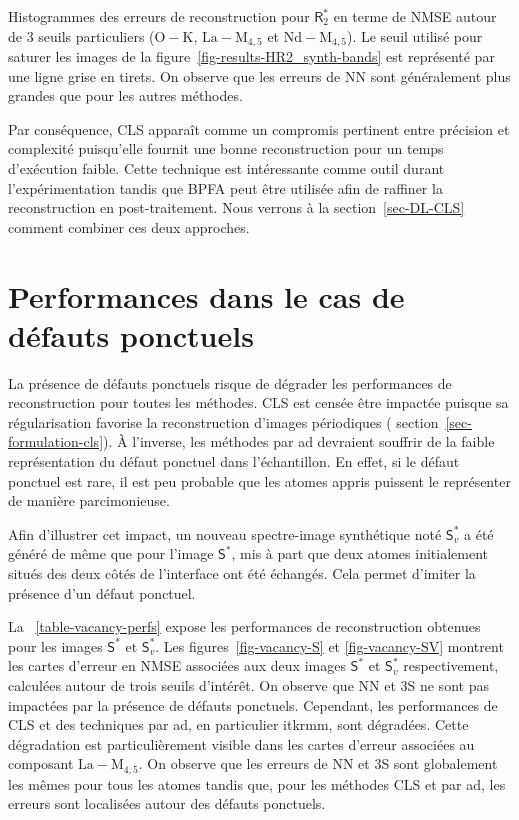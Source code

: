 \begin{normalfigure*}
    \caption{Histogrammes des erreurs de reconstruction pour $\mathsf{R}_2^*$ en terme de NMSE autour de 3 seuils particuliers ($\mathrm{O-K}$, $\mathrm{La-M}_{4, 5}$ et $\mathrm{Nd-M}_{4, 5}$). Le seuil utilisé pour saturer les images de la figure~\protect\ref{fig-results-HR2_synth-bands} est représenté par une ligne grise en tirets. On observe que les erreurs de NN sont généralement plus grandes que pour les autres méthodes.
        \protect\label{fig-qu1-21-histograms}}    
\end{normalfigure*}


Par conséquence, CLS apparaît comme un compromis pertinent entre précision et complexité puisqu'elle fournit une bonne reconstruction pour un temps d'exécution faible. Cette technique est intéressante comme outil durant l'expérimentation tandis que BPFA peut être utilisée afin de raffiner la reconstruction en post-traitement. Nous verrons à la section~\ref{sec-DL-CLS} comment combiner ces deux approches.



\section{Performances dans le cas de défauts ponctuels}

La présence de défauts ponctuels risque de dégrader les performances de reconstruction pour toutes les méthodes. CLS est censée être impactée puisque sa régularisation favorise la reconstruction d'images périodiques (\cf{} section~\ref{sec-formulation-cls}). \`A l'inverse, les méthodes par \gls{ad} devraient souffrir de la faible  représentation du défaut ponctuel dans l'échantillon. En effet, si le défaut ponctuel est rare, il est peu probable que les atomes appris puissent le représenter de manière parcimonieuse.

Afin d'illustrer cet impact, un nouveau spectre-image synthétique noté $\mathsf{S}_v^*$ a été généré de même que pour l'image $\mathsf{S}^*$, mis à part que deux atomes initialement situés des deux côtés de l'interface ont été échangés. Cela permet d'imiter la présence d'un défaut ponctuel.

La \tabname~\ref{table-vacancy-perfs} expose les performances de reconstruction obtenues pour les images $\mathsf{S}^*$ et $\mathsf{S}_v^*$. Les figures~\ref{fig-vacancy-S} et \ref{fig-vacancy-SV} montrent les cartes d'erreur en NMSE associées aux deux images $\mathsf{S}^*$ et $\mathsf{S}_v^*$ respectivement, calculées autour de trois seuils d'intérêt. On observe que NN et 3S ne sont pas impactées par la présence de défauts ponctuels. Cependant, les performances de CLS et des techniques par \gls{ad}, en particulier \gls{itkrmm}, sont dégradées. Cette dégradation est particulièrement visible dans les cartes d'erreur associées au composant $\mathrm{La-M}_{4, 5}$. On observe que les erreurs de NN et 3S sont globalement les mêmes  pour tous les atomes tandis que, pour les méthodes CLS et par \gls{ad}, les erreurs sont localisées autour des défauts ponctuels.

